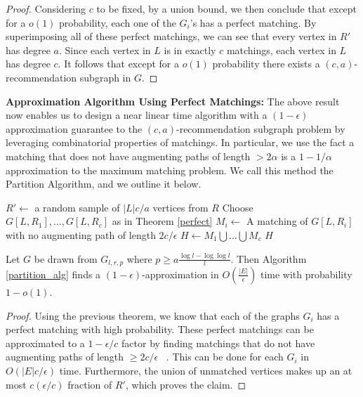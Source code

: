 \begin{proof}
Considering $c$ to be fixed, by a union bound, we then conclude that except
for a $o(1)$ probability, each one of the $G_i$'s has a perfect matching. By
superimposing all of these perfect matchings, we can see that every vertex in
$R'$ has degree $a$. Since each vertex in $L$ is in exactly $c$ matchings, each
vertex in $L$ has degree $c$. It follows that except for a $o(1)$ probability
there exists a $(c,a)$-recommendation subgraph in $G$.
\end{proof}

{\bf Approximation Algorithm Using Perfect Matchings:}
The above result now enables us to design a near linear time
algorithm with a $(1-\epsilon)$ approximation guarantee
to the $(c,a)$-recommendation subgraph problem by leveraging
combinatorial properties of matchings. In particular, we use
the fact a matching that does not have augmenting paths of
length $>2\alpha$ is a $1-1/\alpha$ approximation to the maximum
matching problem. We call this method the Partition Algorithm,
and we outline it below.

\begin{algorithm}[h]\label{partition_alg}
  \SetAlgoLined
  $R' \leftarrow$ a random sample of $|L|c/a$ vertices from $R$\;
  Choose $G[L,R_1],\ldots,G[L,R_c]$ as in Theorem \ref{perfect}\;
   {
    $M_i \leftarrow$ A matching of $G[L,R_i]$ with no augmenting path of length $2c/\epsilon$\;
  }
  $H \leftarrow M_1\bigcup\ldots \bigcup M_c$\;
  \Return $H$\;
  \caption{The partition algorithm}
\end{algorithm}
\vspace{-.2cm}

\begin{thm}
Let $G$ be drawn from $G_{l,r,p}$ where $p \geq a\frac{\log l - \log\log l}{l}$.
Then Algorithm \ref{partition_alg} finds a $(1-\epsilon)$-approximation
in $O(\frac{|E|}{\epsilon})$ time with probability $1-o(1)$.
\end{thm}
\begin{proof}
Using the previous theorem, we know that each of the graphs $G_i$ has a
perfect matching with high probability. These perfect matchings
can be approximated to a $1-\epsilon/c$ factor by finding matchings
that do not have augmenting paths of length $\geq 2c/\epsilon$
~\cite{LovaszPlummer1986}. This can be done for each $G_i$ in
$O(|E|c/\epsilon)$ time. Furthermore, the union of unmatched vertices
makes up an at most $c(\epsilon/c)$ fraction of $R'$, which proves the claim.
\end{proof}

